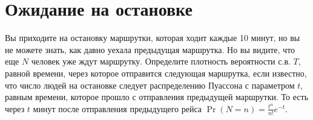 \documentclass[12pt]{article}
\begin{document}
\section{Ожидание на остановке}

Вы приходите на остановку маршрутки, которая ходит каждые 10 минут, но вы не можете знать, как давно уехала предыдущая маршрутка. Но вы видите, что еще $N$ человек уже ждут маршрутку. Определите плотность вероятности с.в. $T$, равной времени, через которое отправится следующая маршрутка, если известно, что число людей на остановке следует распределению Пуассона с параметром $t$, равным времени, которое прошло с отправления предыдущей маршрутки. То есть через $t$ минут после отправления предыдущего рейса $\Pr(N = n) = \frac{t^n}{n!}e^{-t}$.  
\end{document}
